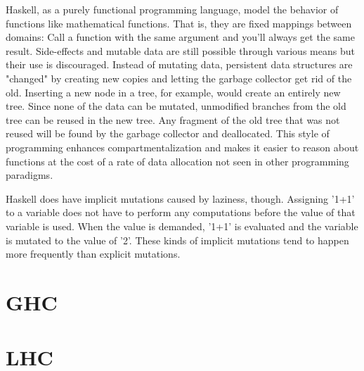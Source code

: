 \documentclass[a4paper,oneside]{memoir}
\begin{document}
Haskell, as a purely functional programming language, model the behavior of
functions like mathematical functions. That is, they are fixed mappings between
domains: Call a function with the same argument and you'll always get the same
result. Side-effects and mutable data are still possible through various means
but their use is discouraged. Instead of mutating data, persistent data structures
are "changed" by creating new copies and letting the garbage collector get rid of
the old. Inserting a new node in a tree, for example, would create an entirely
new tree. Since none of the data can be mutated, unmodified branches from the
old tree can be reused in the new tree. Any fragment of the old tree that was
not reused will be found by the garbage collector and deallocated. This style
of programming enhances compartmentalization and makes it easier to reason about
functions at the cost of a rate of data allocation not seen in other programming
paradigms.

Haskell does have implicit mutations caused by laziness, though. Assigning
'1+1' to a variable does not have to perform any computations before the value
of that variable is used. When the value is demanded, '1+1' is evaluated and
the variable is mutated to the value of '2'. These kinds of implicit mutations
tend to happen more frequently than explicit mutations.

\section{GHC}


\section{LHC}

\end{document}
